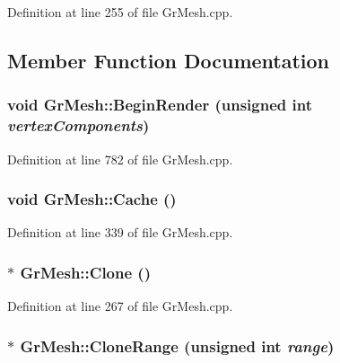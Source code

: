 Definition at line 255 of file GrMesh.cpp.

\subsection{Member Function Documentation}
\hypertarget{class_gr_mesh_2e37339a92db06216e801375e8c2ffc3}{
\subsubsection[{BeginRender}]{\setlength{\rightskip}{0pt plus 5cm}void GrMesh::BeginRender (unsigned int {\em vertexComponents})}}
\label{class_gr_mesh_2e37339a92db06216e801375e8c2ffc3}




Definition at line 782 of file GrMesh.cpp.\hypertarget{class_gr_mesh_ba35b1bb123116cae53994e78ea56758}{
\subsubsection[{Cache}]{\setlength{\rightskip}{0pt plus 5cm}void GrMesh::Cache ()}}
\label{class_gr_mesh_ba35b1bb123116cae53994e78ea56758}




Definition at line 339 of file GrMesh.cpp.\hypertarget{class_gr_mesh_6881fa0be412c2e0d8efef6e1f4e5865}{
\subsubsection[{Clone}]{ $\ast$ GrMesh::Clone ()}}
\label{class_gr_mesh_6881fa0be412c2e0d8efef6e1f4e5865}




Definition at line 267 of file GrMesh.cpp.\hypertarget{class_gr_mesh_52203681acabf93d8193f9111d0853a3}{
\subsubsection[{CloneRange}]{ $\ast$ GrMesh::CloneRange (unsigned int {\em range})}}
\label{class_gr_mesh_52203681acabf93d8193f9111d0853a3}




